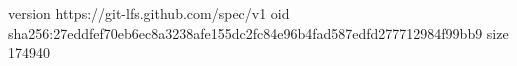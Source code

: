 version https://git-lfs.github.com/spec/v1
oid sha256:27eddfef70eb6ec8a3238afe155dc2fc84e96b4fad587edfd277712984f99bb9
size 174940
